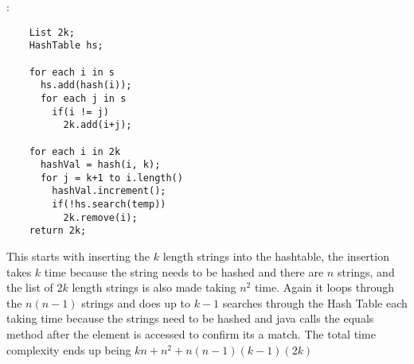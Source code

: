 \documentclass[11pt]{article}
\newcommand\head[1]{\noindent{\large\textbf{#1}}:\newline}
\begin{document}
  \head{WarWithRollHash}
  \begin{verbatim}
    List 2k;
    HashTable hs;

    for each i in s
      hs.add(hash(i));
      for each j in s
        if(i != j)
          2k.add(i+j);

    for each i in 2k
      hashVal = hash(i, k);
      for j = k+1 to i.length()
        hashVal.increment();
        if(!hs.search(temp))
          2k.remove(i);
    return 2k;
  \end{verbatim}
  This starts with inserting the $k$ length strings into the hashtable, the insertion takes $k$ time because the string needs to be hashed
   and there are $n$ strings, and the list of $2k$ length strings is
  also made taking $n^2$ time. Again it loops through the $n(n-1)$ strings and does up to $k-1$ searches through the Hash Table each taking time because
  the strings need to be hashed and java calls the equals method
  after the element is accessed to confirm its a match. The total time complexity ends up being $kn + n^2 + n(n-1)(k-1)(2k)$\\
\end{document}
